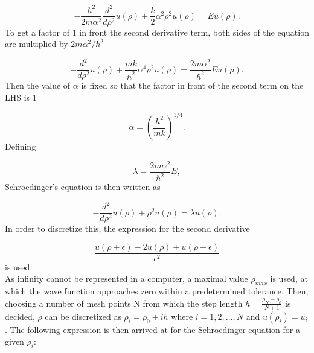 \documentclass[10pt,a4paper]{article}
\begin{document}
\begin{equation*}
  -\frac{\hbar^2}{2 m \alpha^2} \frac{d^2}{d\rho^2} u(\rho) 
       + \frac{k}{2} \alpha^2\rho^2u(\rho)  = E u(\rho) .
\end{equation*}
To get a factor of 1 in front the second derivative term, both sides of the equation are multiplied by $2m\alpha^2/\hbar^2$

\begin{equation*}
  -\frac{d^2}{d\rho^2} u(\rho) 
       + \frac{mk}{\hbar^2} \alpha^4\rho^2u(\rho)  = \frac{2m\alpha^2}{\hbar^2}E u(\rho) .
\end{equation*}
Then the value of $\alpha$ is fixed so that the factor in front of the second term on the LHS is 1

\begin{equation*}
\alpha = \left(\frac{\hbar^2}{mk}\right)^{1/4}.
\end{equation*}
Defining

\begin{equation*}
\lambda = \frac{2m\alpha^2}{\hbar^2}E,
\end{equation*}
Schroedinger's equation is then written as

\begin{equation*}
  -\frac{d^2}{d\rho^2} u(\rho) + \rho^2u(\rho)  = \lambda u(\rho) .
\end{equation*}
In order to discretize this, the expression for the second derivative

\begin{equation*}
  \frac{u(\rho+\epsilon) -2u(\rho) +u(\rho-\epsilon)}{\epsilon^2}
\end{equation*}
is used.\\As infinity cannot be represented in a computer, a maximal value $\rho_{max}$ is used, at which the wave function approaches zero within a predetermined tolerance. Then, choosing a number of mesh points N from which the step length $h=\frac{\rho_N-\rho_0 }{N+1}$ is decided, $\rho$ can be discretized as $\rho_i= \rho_0 + ih$ where $i=1,2,\dots , N$ and $u(\rho_i)=u_i$. The following expression is then arrived at for the Schroedinger equation for a given $\rho_i$:
\end{document}
